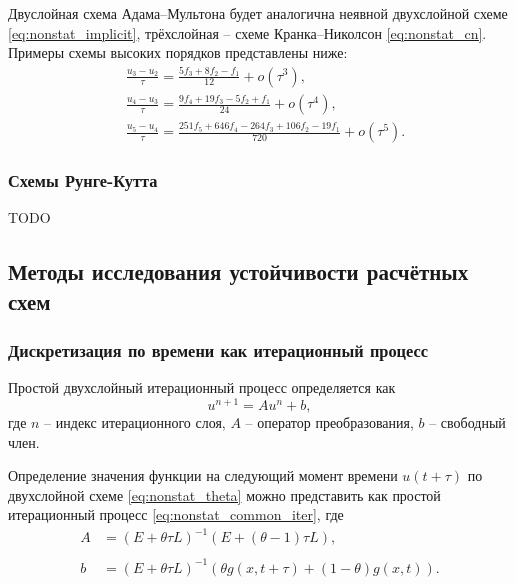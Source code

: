 Двуслойная схема Адама--Мультона будет аналогична неявной двухслойной схеме \cref{eq:nonstat_implicit},
трёхслойная -- схеме Кранка--Николсон \cref{eq:nonstat_cn}. Примеры схемы высоких порядков представлены ниже:
\begin{align*}
&\frac{u_3 - u_2}{\tau} = \frac{5f_3 +  8 f_2 - f_1}{12} + o(\tau^3),\\
&\frac{u_4 - u_3}{\tau} = \frac{9 f_4 + 19 f_3 - 5 f_2 + f_1}{24} + o(\tau^4),\\
&\frac{u_5 - u_4}{\tau} = \frac{251 f_5 + 646 f_4 - 264 f_3 + 106 f_2 - 19 f_1}{720} + o(\tau^5).
\end{align*}

\subsubsection{Схемы Рунге-Кутта}
TODO

\subsection{Методы исследования устойчивости расчётных схем}
\label{sec:stability_analysis}

\subsubsection{Дискретизация по времени как итерационный процесс}


Простой двухслойный итерационный процесс определяется как
\begin{equation}
    \label{eq:nonstat_common_iter}
    u^{n+1} = A u^{n} + b,
\end{equation}
где $n$ -- индекс итерационного слоя,
$A$ -- оператор преобразования,
$b$ -- свободный член.

Определение значения функции на следующий момент времени $u(t+\tau)$ 
по двухслойной схеме \eqref{eq:nonstat_theta} можно представить как простой итерационный процесс \eqref{eq:nonstat_common_iter}, где
\begin{align*}
    A &= \left(E + \theta \tau L \right)^{-1} \left(E + (\theta - 1) \tau L \right), \\\\
    b &= \left(E + \theta \tau L \right)^{-1} \left( \theta g\left(x, t + \tau\right) + \left(1 - \theta\right) g\left(x, t\right) \right).
\end{align*}

